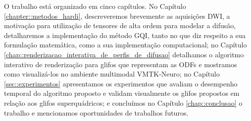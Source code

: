 \documentclass[
    12pt,                %
    oneside,            %
    a4paper,            %
    english,            %
    french,                %
    spanish,            %
    brazil                %
    ]{abntex2}
\begin{document}
O trabalho está organizado em cinco capítulos. No Capítulo \ref{chapter::metodos_hardi}, descreveremos brevemente as aquisições DWI, a motivação para utilização de tensores de alta ordem para modelar a difusão, detalharemos a implementação do método GQI, tanto no que diz respeito a sua formulação matemática, como a sua implementação computacional; no Capítulo \ref{chap::renderizacao_interativa_de_perfis_de_difusao} detalhamos o algoritmo interativo de renderização para glifos que representam as ODFs e mostramos como visualizá-los no ambiente multimodal VMTK-Neuro; no Capítulo \ref{sec::experimentos} apresentamos os experimentos que avaliam o desempenho temporal do algoritmo proposto e validam visualmente os glifos propostos em relação aos glifos superquádricos;
e concluímos no Capítulo \ref{chap::conclusao} o trabalho e mencionamos oportunidades de trabalhos futuros.










%
\end{document}

